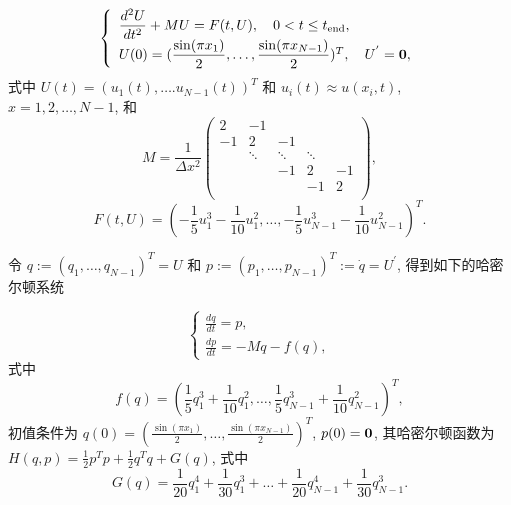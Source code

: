 \begin{equation*}
  \left \{ \begin{array}{l}
      \displaystyle \frac{d^2 U }{d t^2} + MU =F(t, U), \quad 0<t \leq t_{\text{end}},\\
      U(0) = (\dfrac{\sin(\pi x_1)}{2}, \ldots, \dfrac{\sin(\pi x_{N-1})}{2})^{T}, \quad U^{'} ={\bf 0},
    \end{array} \right.
\end{equation*}
式中 $U(t)=(u_1(t), \ldots. u_{N-1}(t))^{T}$ 和 $u_i(t) \approx u(x_i,t)$,
$x=1,2,\ldots,N-1$, 和
\begin{equation*}
  M = \frac{1}{\Delta x^2}
  \begin{pmatrix}
    2 & -1 & & &\\
    -1 & 2 & -1 & & \\
    & \ddots & \ddots& \ddots & \\
    & &-1 & 2 &-1 \\
    & & & -1&2\\
  \end{pmatrix},
\end{equation*}
\begin{equation*}
  F(t,U) = \left( -\frac{1}{5}u_1^3 -\frac{1}{10}u_1^2, \ldots,
    -\frac{1}{5}u_{N-1}^3 -\frac{1}{10}u_{N-1}^2 \right)^{T}.
\end{equation*}

令 $q := (q_1, \ldots, q_{N-1})^{T}= U$ 和 $p :=(p_1, \ldots, p_{N-1})^{T}:= \dot{q} = U^{'}$, 得到如下的哈密尔顿系统

\begin{equation}\label{eq:nonlinwaveH}
  \left \{ \begin{array}{l}
      \displaystyle \frac{d q }{d t} = p,\\
      \displaystyle \frac{d p }{d t} = -Mq - f(q),
    \end{array} \right.
\end{equation}
式中
\begin{equation*}
  f(q) = (\frac{1}{5} q_1^3 + \frac{1}{10} q_1^2, \ldots,
  \frac{1}{5} q_{N-1}^3 + \frac{1}{10} q_{N-1}^2)^{T},
\end{equation*}
初值条件为 $q(0)=(\frac{\sin(\pi x_1)}{2}, \ldots,
\frac{\sin(\pi x_{N-1})}{2})^{T}$, $p(0)={\bf 0}$, 其哈密尔顿函数为
$H(q,p) = \frac{1}{2}p^{ T}p + \frac{1}{2}q^{T}q + G(q)$, 式中
\begin{equation*}
  G(q) = \frac{1}{20} q_1^4 + \frac{1}{30} q_1^3 + \ldots + \frac{1}{20}
  q_{N-1}^4 + \frac{1}{30} q_{N-1}^3.
\end{equation*}

